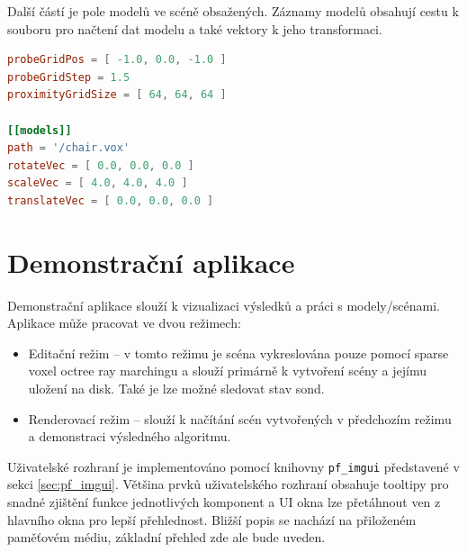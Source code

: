 Další částí je pole modelů ve scéně obsažených. Záznamy modelů obsahují cestu k souboru pro načtení dat modelu a také vektory k jeho transformaci.

\begin{lstlisting}[label={lst:scene_config}, language=toml, caption={Definice jednoduché scény}]
probeGridPos = [ -1.0, 0.0, -1.0 ]
probeGridStep = 1.5
proximityGridSize = [ 64, 64, 64 ]

[[models]]
path = '/chair.vox'
rotateVec = [ 0.0, 0.0, 0.0 ]
scaleVec = [ 4.0, 4.0, 4.0 ]
translateVec = [ 0.0, 0.0, 0.0 ]
\end{lstlisting}

\section{Demonstrační aplikace}
Demonstrační aplikace slouží k vizualizaci výsledků a práci s modely/scénami. Aplikace může pracovat ve dvou režimech:
\begin{itemize}
    \item Editační režim -- v tomto režimu je scéna vykreslována pouze pomocí sparse voxel octree ray marchingu a slouží primárně k vytvoření scény a jejímu uložení na disk. Také je lze možné sledovat stav sond.
    \item Renderovací režim -- slouží k načítání scén vytvořených v předchozím režimu a demonstraci výsledného algoritmu.
\end{itemize}

Uživatelské rozhraní je implementováno pomocí knihovny \texttt{pf\_imgui} představené v sekci \ref{sec:pf_imgui}. Většina prvků uživatelského rozhraní obsahuje tooltipy pro snadné zjištění funkce jednotlivých komponent a UI okna lze přetáhnout ven z hlavního okna pro lepší přehlednost. Bližší popis se nachází na přiloženém paměťovém médiu, základní přehled zde ale bude uveden.

